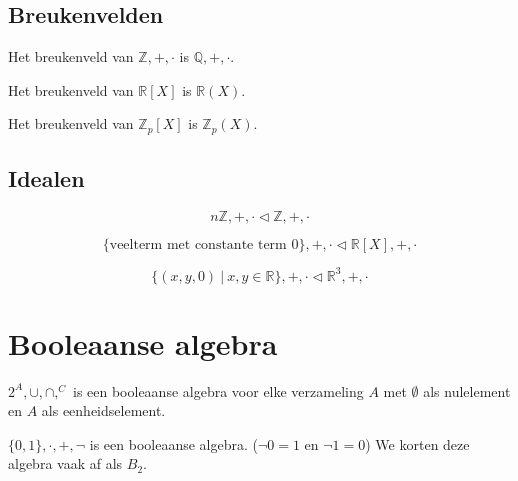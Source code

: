 \documentclass[main.tex]{subfiles}
\begin{document}
\subsection{Breukenvelden}
\label{sec:breukenvelden}

\begin{vb}
  Het breukenveld van $\mathbb{Z},+,\cdot$ is $\mathbb{Q},+,\cdot$.
\end{vb}

\begin{vb}
  Het breukenveld van $\mathbb{R}[X]$ is $\mathbb{R}(X)$.
\end{vb}

\begin{vb}
  Het breukenveld van $\mathbb{Z}_{p}[X]$ is $\mathbb{Z}_{p}(X)$.
\end{vb}

\subsection{Idealen}
\label{sec:idealen}

\begin{vb}
  \[ n\mathbb{Z},+,\cdot \triangleleft \mathbb{Z},+,\cdot \]
\end{vb}

\begin{vb}
  \[ \{\text{veelterm met constante term } 0 \},+,\cdot \triangleleft \mathbb{R}[X],+,\cdot \]
\end{vb}

\begin{vb}
  \[ \{ (x,y,0) \ |\ x,y \in \mathbb{R} \},+,\cdot \triangleleft \mathbb{R}^{3},+,\cdot \]
\end{vb}





 


\section{Booleaanse algebra}
\label{sec:booleaanse-algebra}

\begin{vb}
  $2^{A},\cup,\cap,^{C}$ is een booleaanse algebra voor elke verzameling $A$ met $\emptyset$ als nulelement en $A$ als eenheidselement.
\end{vb}

\begin{vb}
  $\{0,1\},\cdot,+,\neg$ is een booleaanse algebra. ($\neg 0 = 1$ en $\neg 1 = 0$)
  We korten deze algebra vaak af als $B_{2}$.
\end{vb}
\end{document}
